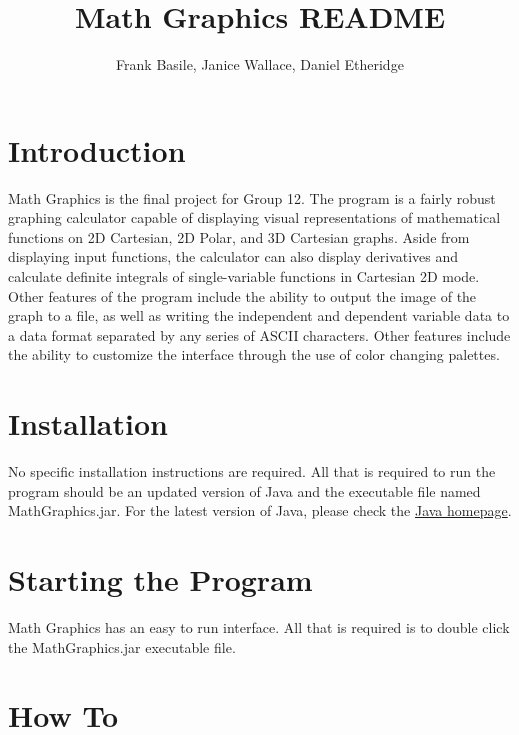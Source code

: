 \documentclass{article}[12 pt]
\begin{document}
\title{Math Graphics README}
\author{Frank Basile, Janice Wallace, Daniel Etheridge}
\maketitle

\tableofcontents
	\section{Introduction}
		Math Graphics is the final project for Group 12. The program is a fairly robust graphing calculator capable of displaying visual representations of mathematical functions on 2D Cartesian, 2D Polar, and 3D Cartesian graphs. Aside from displaying input functions, the calculator can also display derivatives and calculate definite integrals of single-variable functions in Cartesian 2D mode. Other features of the program include the ability to output the image of the graph to a file, as well as writing the independent and dependent variable data to a data format separated by any series of ASCII characters. Other features include the ability to customize the interface through the use of color changing palettes.

	\section{Installation}
	    No specific installation instructions are required. All that is required to run the program should be an updated version of Java and the executable file named MathGraphics.jar. For the latest version of Java, please check the \href{http://www.java.com}{Java homepage}.
	    
	\section{Starting the Program}
		Math Graphics has an easy to run interface. All that is required is to double click the MathGraphics.jar executable file. 
		
	\section{How To}
\end{document}
